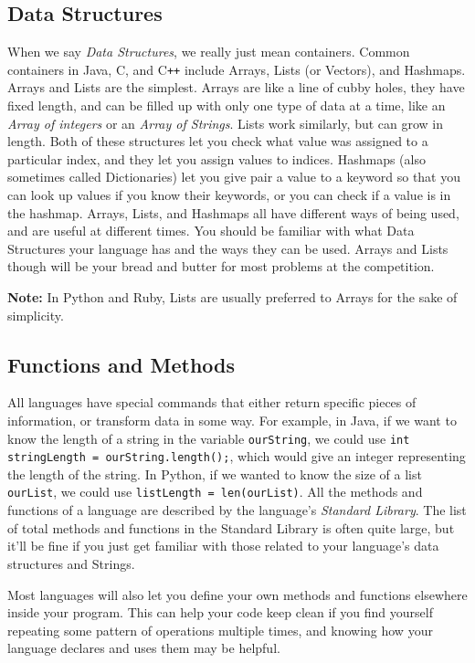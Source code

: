 \documentclass[a4paper]{article}
\begin{document}
\subsection{Data Structures}
When we say \textit{Data Structures}, we really just mean containers. Common containers in Java, C, and C\texttt{++} include Arrays, Lists (or Vectors), and Hashmaps. Arrays and Lists are the simplest. Arrays are like a line of cubby holes, they have fixed length, and can be filled up with only one type of data at a time, like an \textit{Array of integers} or an \textit{Array of Strings}. Lists work similarly, but can grow in length. Both of these structures let you check what value was assigned to a particular index, and they let you assign values to indices. Hashmaps (also sometimes called Dictionaries) let you give pair a value to a keyword so that you can look up values if you know their keywords, or you can check if a value is in the hashmap. Arrays, Lists, and Hashmaps all have different ways of being used, and are useful at different times. You should be familiar with what Data Structures your language has and the ways they can be used. Arrays and Lists though will be your bread and butter for most problems at the competition.

\textbf{Note:} In Python and Ruby, Lists are usually preferred to Arrays for the sake of simplicity. 

\subsection{Functions and Methods}
All languages have special commands that either return specific pieces of information, or transform data in some way. For example, in Java, if we want to know the length of a string in the variable \texttt{ourString}, we could use \texttt{int stringLength = ourString.length();}, which would give an integer representing the length of the string. In Python, if we wanted to know the size of a list \texttt{ourList}, we could use \texttt{listLength = len(ourList)}. All the methods and functions of a language are described by the language's \textit{Standard Library}. The list of total methods and functions in the Standard Library is often quite large, but it'll be fine if you just get familiar with those related to your language's data structures and Strings. 

Most languages will also let you define your own methods and functions elsewhere inside your program. This can help your code keep clean if you find yourself repeating some pattern of operations multiple times, and knowing how your language declares and uses them may be helpful.
\end{document}
